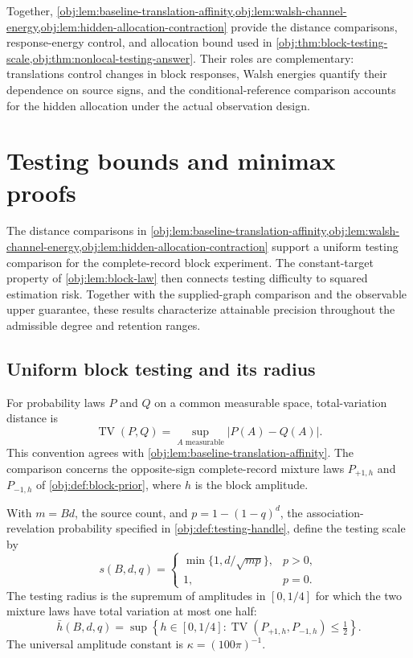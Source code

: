 \documentclass[11pt]{article}
\begin{document}
Together, \cref{obj:lem:baseline-translation-affinity,obj:lem:walsh-channel-energy,obj:lem:hidden-allocation-contraction} provide the distance comparisons, response-energy control, and allocation bound used in \cref{obj:thm:block-testing-scale,obj:thm:nonlocal-testing-answer}. Their roles are complementary: translations control changes in block responses, Walsh energies quantify their dependence on source signs, and the conditional-reference comparison accounts for the hidden allocation under the actual observation design.


\section{Testing bounds and minimax proofs}

The distance comparisons in \cref{obj:lem:baseline-translation-affinity,obj:lem:walsh-channel-energy,obj:lem:hidden-allocation-contraction} support a uniform testing comparison for the complete-record block experiment. The constant-target property of \cref{obj:lem:block-law} then connects testing difficulty to squared estimation risk. Together with the supplied-graph comparison and the observable upper guarantee, these results characterize attainable precision throughout the admissible degree and retention ranges.

\subsection{Uniform block testing and its radius}

For probability laws \(P\) and \(Q\) on a common measurable space, total-variation distance is
\[
\operatorname{TV}(P,Q)
=\sup_{A\text{ measurable}}|P(A)-Q(A)|.
\]
This convention agrees with \cref{obj:lem:baseline-translation-affinity}. The comparison concerns the opposite-sign complete-record mixture laws \(P_{+1,h}\) and \(P_{-1,h}\) of \cref{obj:def:block-prior}, where \(h\) is the block amplitude.

With \(m=Bd\), the source count, and \(p=1-(1-q)^d\), the association-revelation probability specified in \cref{obj:def:testing-handle}, define the testing scale by
\[
s(B,d,q)=
\begin{cases}
\min\{1,d/\sqrt{mp}\},&p>0,\\
1,&p=0.
\end{cases}
\]
The testing radius is the supremum of amplitudes in \([0,1/4]\) for which the two mixture laws have total variation at most one half:
\[
\bar h(B,d,q)
=\sup\left\{h\in[0,1/4]:
\operatorname{TV}(P_{+1,h},P_{-1,h})\le\tfrac12\right\}.
\]
The universal amplitude constant is \(\kappa=(100\pi)^{-1}\).
\end{document}
